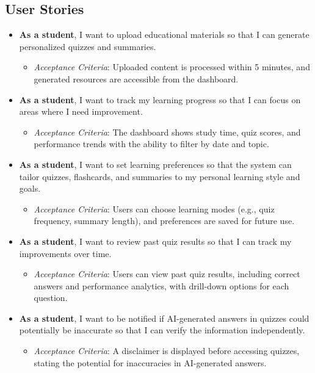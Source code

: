 \documentclass[12pt]{article}
\begin{document}
\subsection{User Stories}
\begin{itemize}
    \item \textbf{As a student}, I want to upload educational materials so that I can generate personalized quizzes and summaries.
        \begin{itemize}
            \item \textit{Acceptance Criteria}: Uploaded content is processed within 5 minutes, and generated resources are accessible from the dashboard.
        \end{itemize}
    
    \item \textbf{As a student}, I want to track my learning progress so that I can focus on areas where I need improvement.
        \begin{itemize}
            \item \textit{Acceptance Criteria}: The dashboard shows study time, quiz scores, and performance trends with the ability to filter by date and topic.
        \end{itemize}
    
    \item \textbf{As a student}, I want to set learning preferences so that the system can tailor quizzes, flashcards, and summaries to my personal learning style and goals.
        \begin{itemize}
            \item \textit{Acceptance Criteria}: Users can choose learning modes (e.g., quiz frequency, summary length), and preferences are saved for future use.
        \end{itemize}

    \item \textbf{As a student}, I want to review past quiz results so that I can track my improvements over time.
        \begin{itemize}
            \item \textit{Acceptance Criteria}: Users can view past quiz results, including correct answers and performance analytics, with drill-down options for each question.
        \end{itemize}
    
    \item \textbf{As a student}, I want to be notified if AI-generated answers in quizzes could potentially be inaccurate so that I can verify the information independently.
        \begin{itemize}
            \item \textit{Acceptance Criteria}: A disclaimer is displayed before accessing quizzes, stating the potential for inaccuracies in AI-generated answers.
        \end{itemize}
\end{itemize}
\end{document}

